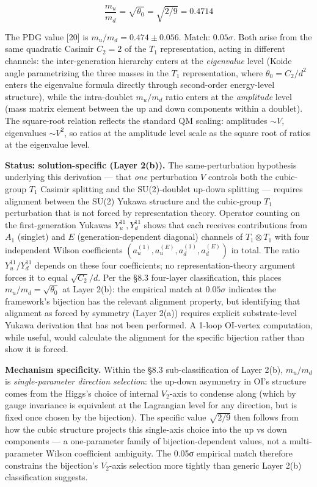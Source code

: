 \documentclass[
]{article}
\begin{document}
\[\boxed{\frac{m_u}{m_d} = \sqrt{\theta_0} = \sqrt{2/9} = 0.4714}\]

The PDG value {[}20{]} is \(m_u/m_d = 0.474 \pm 0.056\). Match:
\(0.05\sigma\). Both arise from the same quadratic Casimir \(C_2 = 2\)
of the \(T_1\) representation, acting in different channels: the
inter-generation hierarchy enters at the \emph{eigenvalue} level (Koide
angle parametrizing the three masses in the \(T_1\) representation,
where \(\theta_0 = C_2/d^2\) enters the eigenvalue formula directly
through second-order energy-level structure), while the intra-doublet
\(m_u/m_d\) ratio enters at the \emph{amplitude} level (mass matrix
element between the up and down components within a doublet). The
square-root relation reflects the standard QM scaling: amplitudes
\(\sim V\), eigenvalues \(\sim V^2\), so ratios at the amplitude level
scale as the square root of ratios at the eigenvalue level.

\textbf{Status: solution-specific (Layer 2(b)).} The same-perturbation
hypothesis underlying this derivation --- that \emph{one} perturbation
\(V\) controls both the cubic-group \(T_1\) Casimir splitting and the
SU(2)-doublet up-down splitting --- requires alignment between the SU(2)
Yukawa structure and the cubic-group \(T_1\) perturbation that is not
forced by representation theory. Operator counting on the
first-generation Yukawas \(Y_u^{11}, Y_d^{11}\) shows that each receives
contributions from \(A_1\) (singlet) and \(E\) (generation-dependent
diagonal) channels of \(T_1 \otimes T_1\) with four independent Wilson
coefficients \((a_u^{(1)}, a_u^{(E)}, a_d^{(1)}, a_d^{(E)})\) in total.
The ratio \(Y_u^{11}/Y_d^{11}\) depends on these four coefficients; no
representation-theory argument forces it to equal \(\sqrt{C_2}/d\). Per
the §8.3 four-layer classification, this places
\(m_u/m_d = \sqrt{\theta_0}\) at Layer 2(b): the empirical match at
\(0.05\sigma\) indicates the framework's bijection has the relevant
alignment property, but identifying that alignment as forced by symmetry
(Layer 2(a)) requires explicit substrate-level Yukawa derivation that
has not been performed. A 1-loop OI-vertex computation, while useful,
would calculate the alignment for the specific bijection rather than
show it is forced.

\textbf{Mechanism specificity.} Within the §8.3 sub-classification of
Layer 2(b), \(m_u/m_d\) is \emph{single-parameter direction selection}:
the up-down asymmetry in OI's structure comes from the Higgs's choice of
internal \(V_2\)-axis to condense along (which by gauge invariance is
equivalent at the Lagrangian level for any direction, but is fixed once
chosen by the bijection). The specific value \(\sqrt{2/9}\) then follows
from how the cubic structure projects this single-axis choice into the
up vs down components --- a one-parameter family of bijection-dependent
values, not a multi-parameter Wilson coefficient ambiguity. The 0.05σ
empirical match therefore constrains the bijection's \(V_2\)-axis
selection more tightly than generic Layer 2(b) classification suggests.
\end{document}
